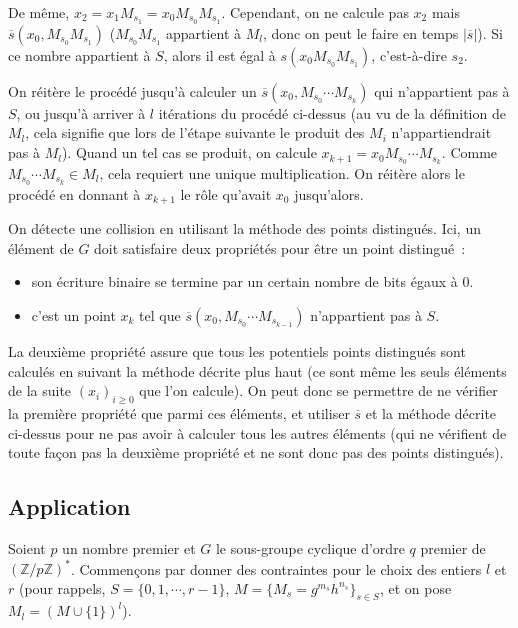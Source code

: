       De même, $x_2 = x_1 M_{s_1} = x_0 M_{s_0} M_{s_1}$. Cependant, on ne calcule pas $x_2$ mais $\overline{s}(x_0,M_{s_0} M_{s_1})$ ($M_{s_0} M_{s_1}$ appartient à $M_l$, donc on peut le faire en temps $|\overline{s}|$). Si ce nombre appartient à $S$, alors il est égal à $s(x_0 M_{s_0} M_{s_1})$, c'est-à-dire $s_2$.

      On réitère le procédé jusqu'à calculer un $\overline{s}(x_0,M_{s_0} \cdots M_{s_k})$ qui n'appartient pas à $S$, ou jusqu'à arriver à $l$ itérations du procédé ci-dessus (au vu de la définition de $M_l$, cela signifie que lors de l'étape suivante le produit des $M_i$ n'appartiendrait pas à $M_l$). Quand un tel cas se produit, on calcule $x_{k+1} = x_0 M_{s_0} \cdots M_{s_k}$. Comme $M_{s_0} \cdots M_{s_k} \in M_l$, cela requiert une unique multiplication. On réitère alors le procédé en donnant à $x_{k+1}$ le rôle qu'avait $x_0$ jusqu'alors.

      On détecte une collision en utilisant la méthode des points distingués. Ici, un élément de $G$ doit satisfaire deux propriétés pour être un point distingué~:

      \begin{itemize}
        \item son écriture binaire se termine par un certain nombre de bits égaux à $0$.
        \item c'est un point $x_k$ tel que $\overline{s}(x_0,M_{s_0} \cdots M_{s_{k-1}})$ n'appartient pas à $S$.
      \end{itemize}

      La deuxième propriété assure que tous les potentiels points distingués sont calculés en suivant la méthode décrite plus haut (ce sont même les seuls éléments de la suite $(x_i)_{i \ge 0}$ que l'on calcule). On peut donc se permettre de ne vérifier la première propriété que parmi ces éléments, et utiliser $\overline{s}$ et la méthode décrite ci-dessus pour ne pas avoir à calculer tous les autres éléments (qui ne vérifient de toute façon pas la deuxième propriété et ne sont donc pas des points distingués).


    \subsection{Application}
    Soient $p$ un nombre premier et $G$ le sous-groupe cyclique d'ordre $q$ premier de $(\mathbb{Z}/p\mathbb{Z})^*$. Commençons par donner des contraintes pour le choix des entiers $l$ et $r$ (pour rappels, $S = \{0,1,\cdots,r-1\}$, $M=\{M_s = g^{m_s} h^{n_s}\}_{s \in S}$, et on pose $M_l = (M\cup\{1\})^l$).


